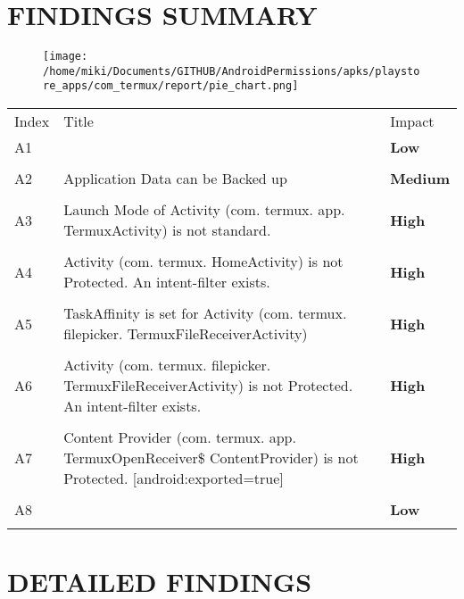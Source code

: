 \documentclass[12p]{article}
\begin{document}
\section{FINDINGS SUMMARY}\label{sec:summary}
\begin{figure}[H]
\centering
	\texttt{[image: /home/miki/Documents/GITHUB/AndroidPermissions/apks/playstore\_apps/com\_termux/report/pie\_chart.png]}
\end{figure}
	\begin{longtable}{p{0.5cm} p{10cm} p{1.5cm}}
	\rowcolor{grannysmithapple!70} Index & Title & Impact \\
	A1&& \color{amber}\textbf{Low} \\
\hline\\	A2&Application Data can be Backed up& \color{orange(colorwheel)}\textbf{Medium} \\
\hline\\	A3&Launch Mode of Activity \newline (com. termux. app. TermuxActivity) is not standard.& \color{ferrarired}\textbf{High} \\
\hline\\	A4&Activity \newline (com. termux. HomeActivity) is not Protected. An intent-filter exists.& \color{ferrarired}\textbf{High} \\
\hline\\	A5&TaskAffinity is set for Activity \newline (com. termux. filepicker. TermuxFileReceiverActivity)& \color{ferrarired}\textbf{High} \\
\hline\\	A6&Activity \newline (com. termux. filepicker. TermuxFileReceiverActivity) is not Protected. An intent-filter exists.& \color{ferrarired}\textbf{High} \\
\hline\\	A7&Content Provider \newline (com. termux. app. TermuxOpenReceiver\$ ContentProvider) is not Protected. [android:exported=true]& \color{ferrarired}\textbf{High} \\
\hline\\	A8&& \color{amber}\textbf{Low} \\
\hline\\	\end{longtable}
\cleardoublepage
\newpage
\section{DETAILED FINDINGS}
\end{document}
